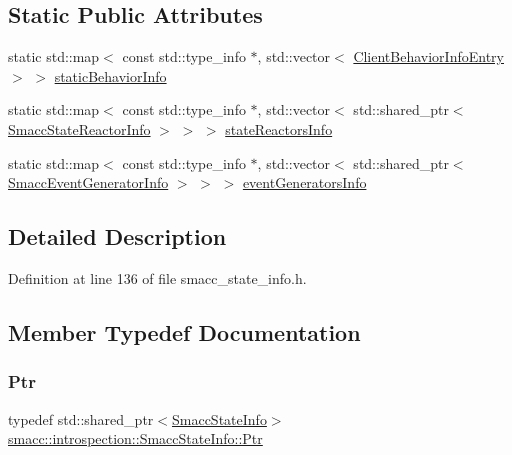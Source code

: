 \subsection*{Static Public Attributes}
\begin{DoxyCompactItemize}
\item 
static std\+::map$<$ const std\+::type\+\_\+info $\ast$, std\+::vector$<$ \hyperlink{structsmacc_1_1introspection_1_1ClientBehaviorInfoEntry}{Client\+Behavior\+Info\+Entry} $>$ $>$ \hyperlink{classsmacc_1_1introspection_1_1SmaccStateInfo_ad3d8b3450060cb0b91f38fb2fe0a7678}{static\+Behavior\+Info}
\item 
static std\+::map$<$ const std\+::type\+\_\+info $\ast$, std\+::vector$<$ std\+::shared\+\_\+ptr$<$ \hyperlink{structsmacc_1_1introspection_1_1SmaccStateReactorInfo}{Smacc\+State\+Reactor\+Info} $>$ $>$ $>$ \hyperlink{classsmacc_1_1introspection_1_1SmaccStateInfo_abd1d6ca5060c87f6bd11fde3e5b2ac4d}{state\+Reactors\+Info}
\item 
static std\+::map$<$ const std\+::type\+\_\+info $\ast$, std\+::vector$<$ std\+::shared\+\_\+ptr$<$ \hyperlink{structsmacc_1_1introspection_1_1SmaccEventGeneratorInfo}{Smacc\+Event\+Generator\+Info} $>$ $>$ $>$ \hyperlink{classsmacc_1_1introspection_1_1SmaccStateInfo_ae38b8c98fb7808cc67b67e1f97ddbf74}{event\+Generators\+Info}
\end{DoxyCompactItemize}


\subsection{Detailed Description}


Definition at line 136 of file smacc\+\_\+state\+\_\+info.\+h.



\subsection{Member Typedef Documentation}
\mbox{\label{classsmacc_1_1introspection_1_1SmaccStateInfo_a374ef2022bca958ab14469931fc4dcc1}} 
\subsubsection{\texorpdfstring{Ptr}{Ptr}}
{\footnotesize\ttfamily typedef std\+::shared\+\_\+ptr$<$\hyperlink{classsmacc_1_1introspection_1_1SmaccStateInfo}{Smacc\+State\+Info}$>$ \hyperlink{classsmacc_1_1introspection_1_1SmaccStateInfo_a374ef2022bca958ab14469931fc4dcc1}{smacc\+::introspection\+::\+Smacc\+State\+Info\+::\+Ptr}}



